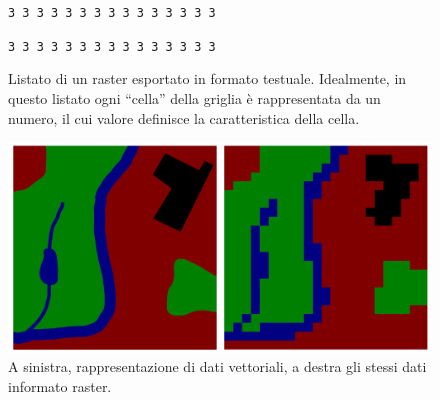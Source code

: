 \begin{figure}
\begin{minipage}[c][1\totalheight][t]{0.5\columnwidth}
\begin{spacing}{0.3}
					\begin{center} \texttt{3 3 3 3 3 3 3 3 3 3 3 3 3 3 3} \par\end{center}
					\begin{center} \texttt{3 3 3 3 3 3 3 3 3 3 3 3 3 3 3} \par\end{center}
				\end{spacing}
			\end{minipage}
		\caption{{\small\label{fig:Listato-di-un-raster}Listato di un raster esportato in formato testuale. Idealmente, in questo listato ogni ``cella'' della griglia è rappresentata da un numero, il cui valore definisce la caratteristica della cella.}}
	\end{figure}

	\begin{figure}
		\centering
		\includegraphics[scale=0.1]{img/Raster_vector_gis}
		\caption{{\small\label{fig:A-sinistra,-rappresentazione}A sinistra, rappresentazione di dati vettoriali, a destra gli stessi dati informato raster.}}
	\end{figure}
	
